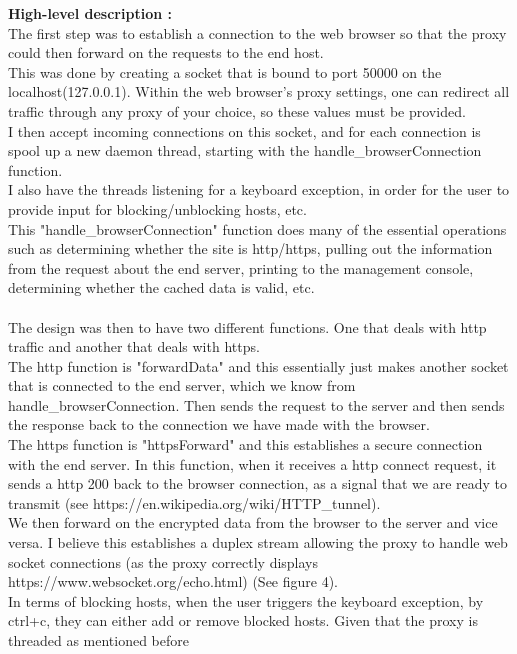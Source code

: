 \documentclass{report}
\begin{document}
    \textbf{High-level description :}\\
    The first step was to establish a connection to the web browser so that the proxy could then forward on the requests to the end host.\\
    This was done by creating a socket that is bound to port 50000 on the localhost(127.0.0.1). Within the web browser's proxy settings, one can redirect all traffic through 
    any proxy of your choice, so these values must be provided.\\
    I then accept incoming connections on this socket, and for each connection is spool up a new daemon thread, starting with the handle\_browserConnection function.\\
    I also have the threads listening for a keyboard exception, in order for the user to provide input for blocking/unblocking hosts, etc.\\
    This "handle\_browserConnection" function does many of the essential operations such as determining whether the site is http/https, pulling out the information from the request
    about the end server, printing to the management console, determining whether the cached data is valid, etc.\\\\
    The design was then to have two different functions. One that deals with http traffic and another that deals with https.\\
    The http function is "forwardData" and this essentially just makes another socket that is connected to the end server, which we know from handle\_browserConnection. Then sends 
    the request to the server and then sends the response back to the connection we have made with the browser.\\
    The https function is "httpsForward" and this establishes a secure connection with the end server. In this function, when it receives a http connect request, it sends a http 200
    back to the browser connection, as a signal that we are ready to transmit (see https://en.wikipedia.org/wiki/HTTP\_tunnel).\\
    We then forward on the encrypted data from the browser to the server and vice versa. I believe this establishes a duplex stream allowing the proxy to handle web socket connections 
    (as the proxy correctly displays https://www.websocket.org/echo.html) (See figure 4).\\
    In terms of blocking hosts, when the user triggers the keyboard exception, by ctrl+c, they can either add or remove blocked hosts. Given that the proxy is threaded as mentioned before
\end{document}
